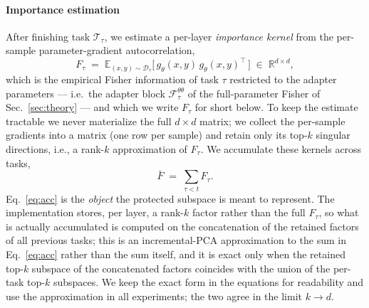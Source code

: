 \paragraph{Importance estimation}
After finishing task $\mathcal{T}_\tau$, we estimate a per-layer \emph{importance
kernel} from the per-sample parameter-gradient autocorrelation,
\begin{equation}
F_\tau \;=\; \mathbb{E}_{(x,y)\sim\mathcal{D}_\tau}\big[\,g_{\theta}(x,y)\,g_{\theta}(x,y)^{\!\top}\,\big]
\;\in\;\mathbb{R}^{d\times d},
\label{eq:kernel}
\end{equation}
which is the empirical Fisher information of task $\tau$ restricted to the adapter
parameters --- i.e.\ the adapter block $\mathcal{F}_\tau^{\theta\theta}$ of the
full-parameter Fisher of Sec.~\ref{sec:theory} --- and which we write $F_\tau$ for short
below. To keep the estimate tractable we never materialize the full $d\times d$
matrix; we collect the per-sample gradients into a matrix (one row per sample) and retain
only its top-$k$ singular directions, i.e., a rank-$k$ approximation of $F_\tau$. We
accumulate these kernels across tasks,
\begin{equation}
\bar{F} \;=\; \sum_{\tau < t} F_\tau.
\label{eq:acc}
\end{equation}
Eq.~\eqref{eq:acc} is the \emph{object} the protected subspace is meant to represent.
The implementation stores, per layer, a rank-$k$ factor rather than the full $F_\tau$, so
what is actually accumulated is computed on the concatenation of the retained factors of
all previous tasks; this is an incremental-PCA approximation to the sum in
Eq.~\eqref{eq:acc} rather than the sum itself, and it is exact only when the retained
top-$k$ subspace of the concatenated factors coincides with the union of the per-task
top-$k$ subspaces. We keep the exact form in the equations for readability and use the
approximation in all experiments; the two agree in the limit $k\to d$.

